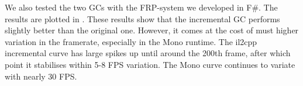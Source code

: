 
We also tested the two \glspl{GC} with the \gls{FRP}-system we developed in F\#. The results are plotted in . These results show that the incremental \gls{GC} performs slightly better than the original one. However, it comes at the cost of must higher variation in the framerate, especially in the Mono runtime. The il2cpp incremental curve has large spikes up until around the 200th frame, after which point it stabilises within 5-8 \gls{FPS} variation. The Mono curve continues to variate with nearly 30 \gls{FPS}.

